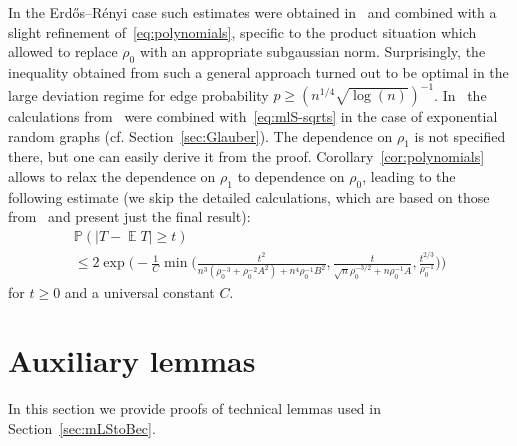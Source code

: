 \documentclass[a4paper]{amsart}
\theoremstyle{definition}
\theoremstyle{remark}
\numberwithin{equation}{section}
\DeclareMathOperator{\EE}{\mathbb{E}} %
\newcommand*{\PP}{\mathbb{P}} %
\begin{document}
In the Erd\H{o}s--R\'enyi case such estimates were obtained in~\cite{MR3383337} and combined with a slight refinement of~\eqref{eq:polynomials}, specific to the product situation which allowed to replace $\rho_0$ with an appropriate subgaussian norm. 
Surprisingly, the inequality obtained from such a general approach turned out to be optimal in the large deviation regime for edge probability $p \ge(n^{1/4}\sqrt{\log(n)})^{-1}$. 
In~\cite{gtze2018concentration} the calculations from~\cite{MR3383337} were combined with~\eqref{eq:mlS-sqrts} in the case of exponential random graphs (cf. Section~\ref{sec:Glauber}). The dependence on $\rho_1$ is not specified there, but one can easily derive it from the proof. Corollary~\eqref{cor:polynomials} allows to  relax the dependence on $\rho_1$ to dependence on $\rho_0$, leading to the following estimate (we skip the detailed calculations, which are based on those from~\cite{MR3383337} and present just the final result):
\begin{multline*}
  \PP(|T - \EE T| \ge t) \\
  \le 2\exp\Big(-\frac{1}{C}\min\Big(\frac{t^2}{n^3 (\rho_0^{-3} + \rho_0^{-2} A^2) + n^4\rho_0^{-1} B^2}, \frac{t}{\sqrt{n}\rho_0^{-3/2} + n \rho_0^{-1} A}, \frac{t^{2/3}}{\rho_0^{-1}}\Big)\Big)
\end{multline*}
for $t \ge 0$ and a universal constant $C$.

\appendix
\section{Auxiliary lemmas}\label{app-auxiliary-lemmas}
In this section we provide proofs of technical lemmas used in Section~\ref{sec:mLStoBec}.
\end{document}
